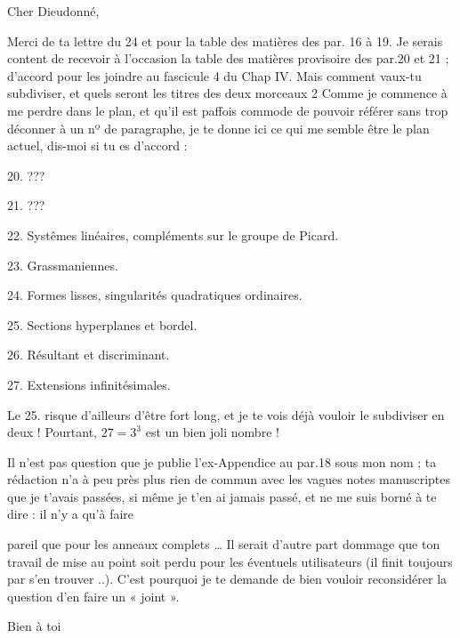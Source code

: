 \documentclass[11pt,a4paper]{article}
\begin{document}


Cher Dieudonné,

Merci de ta lettre du 24 et pour la table des matières des par.
16 à 19. Je serais content de recevoir à l'occasion la table des
matières provisoire des par.20 et 21 ; d'accord pour les joindre au
fascicule 4 du Chap IV. Mais comment vaux-tu   subdiviser, et
quels seront les titres des deux morceaux 2 Comme je commence à me
perdre dans le plan, et qu'il est paffois commode de pouvoir référer
sans trop déconner à un nº de paragraphe, je te donne ici ce qui me
semble être le plan actuel, dis-moi si tu es d'accord :

20. ???

21. ???

22. Systêmes linéaires, compléments sur le groupe de Picard.

23. Grassmaniennes.

24. Formes lisses, singularités quadratiques ordinaires.

25. Sections hyperplanes et bordel.

26. Résultant et discriminant.

27. Extensions infinitésimales.

Le 25. risque d'ailleurs d'être fort long, et je te vois déjà
vouloir le subdiviser en deux ! Pourtant, $27=3^{3}$ est un bien joli
nombre !

Il n'est pas question que je publie l'ex-Appendice au par.18
sous mon nom ; ta rédaction n'a à peu près plus rien de commun avec
les vagues notes manuscriptes que je t'avais passées, si même je t'en
ai jamais passé, et ne me suis borné à te dire : il n'y a qu'à faire

pareil que pour les anneaux complets … Il serait d'autre part dommage
que ton travail de mise au point soit perdu pour les éventuels
utilisateurs (il finit toujours par s'en trouver ..). C'est pourquoi
je te demande de bien vouloir reconsidérer la question d'en faire un
« joint  ».


Bien à toi

\end{document}
